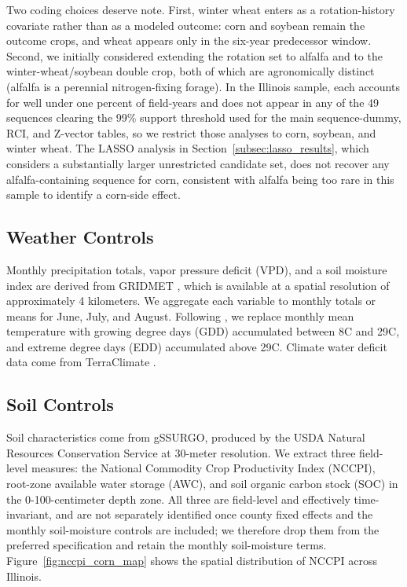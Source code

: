 \documentclass[12pt,letterpaper]{article}
\theoremstyle{remark}
\theoremstyle{remark}
\theoremstyle{plain}
\theoremstyle{definition}
\begin{document}
Two coding choices deserve note. First, winter wheat enters as a rotation-history covariate rather than as a modeled outcome: corn and soybean remain the outcome crops, and wheat appears only in the six-year predecessor window. Second, we initially considered extending the rotation set to alfalfa and to the winter-wheat/soybean double crop, both of which are agronomically distinct (alfalfa is a perennial nitrogen-fixing forage). In the Illinois sample, each accounts for well under one percent of field-years and does not appear in any of the 49 sequences clearing the 99\% support threshold used for the main sequence-dummy, RCI, and Z-vector tables, so we restrict those analyses to corn, soybean, and winter wheat. The LASSO analysis in Section~\ref{subsec:lasso_results}, which considers a substantially larger unrestricted candidate set, does not recover any alfalfa-containing sequence for corn, consistent with alfalfa being too rare in this sample to identify a corn-side effect.

\subsection{\label{subsec:w_controls}Weather Controls}
Monthly precipitation totals, vapor pressure deficit (VPD), and a soil moisture index are derived from GRIDMET \citep{Abatzoglou2013}, which is available at a spatial resolution of approximately 4 kilometers. We aggregate each variable to monthly totals or means for June, July, and August. Following \citet{SchlenkerRoberts2009}, we replace monthly mean temperature with growing degree days (GDD) accumulated between 8\textdegree C and 29\textdegree C, and extreme degree days (EDD) accumulated above 29\textdegree C. Climate water deficit data come from TerraClimate \citep{Abatzoglou2018}.

\subsection{\label{subsec:soil_controls}Soil Controls}
Soil characteristics come from gSSURGO, produced by the USDA Natural Resources Conservation Service at 30-meter resolution. We extract three field-level measures: the National Commodity Crop Productivity Index (NCCPI), root-zone available water storage (AWC), and soil organic carbon stock (SOC) in the 0-100-centimeter depth zone. All three are field-level and effectively time-invariant, and are not separately identified once county fixed effects and the monthly soil-moisture controls are included; we therefore drop them from the preferred specification and retain the monthly soil-moisture terms. Figure~\ref{fig:nccpi_corn_map} shows the spatial distribution of NCCPI across Illinois.
\end{document}
